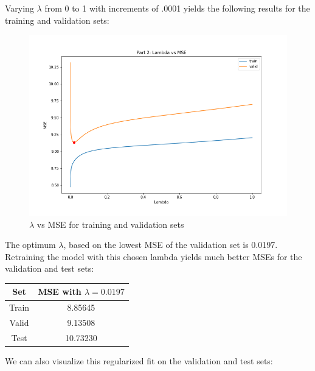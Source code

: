 \documentclass[paper=a4, fontsize=11pt]{scrartcl} %
\numberwithin{equation}{section} %
\numberwithin{figure}{section} %
\numberwithin{table}{section} %
\begin{document}
Varying \(\lambda\) from 0 to 1 with increments of .0001 yields the following results for the training and validation sets:

\begin{figure}[H]
    \includegraphics[width=\linewidth]{q1p14.png}
    \caption{\(\lambda\) vs MSE for training and validation sets}
    \label{fig:q1p14}
\end{figure}

The optimum \(\lambda\), based on the lowest MSE of the validation set is 0.0197. Retraining the model with this chosen lambda yields much better MSEs for the validation and test sets:

\begin{center}
\begin{tabular}{ |c|c| } 
    \hline
    \textbf{Set} & \textbf{MSE with \(\lambda = 0.0197\)} \\ 
    \hline
    Train & 8.85645 \\
    Valid & 9.13508 \\ 
    Test & 10.73230 \\
    \hline
\end{tabular}
\end{center}

We can also visualize this regularized fit on the validation and test sets:
\end{document}
